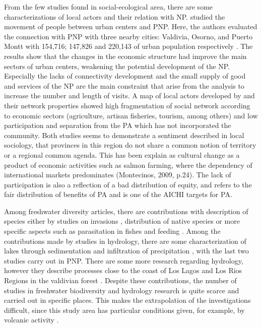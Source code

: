 \documentclass[]{article}
\begin{document}
From the few studies found in social-ecological area, there are some characterizations of local actors and their relation with NP.
\citet{SozaAmigoTurism} studied the movement of people between urban centers and PNP. Here, the authors evaluated the
connection with PNP with three nearby cities: Valdivia, Osorno, and Puerto Montt with 154,716; 147,826 and 220,143 of urban population respectively \citep{Censo2017}.
The results show that the changes in the economic structure had improve the main sectors of urban centers, weakening the potential development of the NP. Especially the lacks of connectivity development and the small supply of good and services of the NP are the main constraint that arise from the analysis to increase the number and length of visits.
A map of local actors developed by \citet{mardones_social} and their network properties showed high fragmentation of social network according to economic sectors (agriculture, artisan fisheries, tourism, among others) and low participation and separation from the PA which has not incorporated the community.
Both studies seems to demonstrate a sentiment described in local sociology, that provinces in this region do not share a common notion of territory or a regional common agenda. This has been explain as cultural change as a product of economic activities such as salmon farming, where the dependency of international markets predominates (Montecinos, 2009, p.24). The lack of participation is also a reflection of a bad distribution of equity, and refers to the fair distribution of benefits of PA \citep{zafra2019progress} and is one of the AICHI targets for PA.

Among freshwater diversity articles, there are contributions with description of species either by studies on invasions \citep{Urrutia2017invasive, Esse2018spectral, Fuentes2019lakes}, distribution of native species \citep{Zapata2008Protozoa, Unmack2009hatcheria} or more specific aspects such as parasitation in fishes \citep{GeorgeNascimento2009} and feeding \citep{Beltran2012dietary}. Among the contributions made by studies in hydrology, there are some characterization of lakes through sedimentation \citetext{\citealp[organic matter preserved in a lake and its watershed:][]{Bertrand2010bulk}; \citealp[environmental impacts associated with increasing industrial activities and land degradation:][]{Fagel2010geochemical}} and infiltration of precipitation \citetext{\citealp[hydrochemical fluxes in a Nothofagus pumilio forest:][]{Godoy1999Hydrochemical}; \citealp[chemical composition of bulk precipitation:][]{Godoy2001precip}}, with the last two studies carry out in PNP. There are some more research regarding hydrology, however they describe processes close to the coast of Los Lagos and Los Rios Regions in the valdivian forest \citep{LittleWatershed}. Despite these contributions, the number of studies in freshwater biodiversity and hydrology research is quite scarce and carried out in specific places. This makes the extrapolation of the investigations difficult, since this study area has particular conditions given, for example, by volcanic activity \citep{Walter2016volcanic}.
\end{document}
